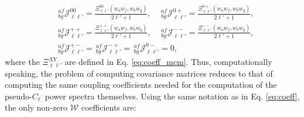 \documentclass[a4paper,11pt]{article}
\newcommand{\PCL}{pseudo-$C_\ell$~}
\begin{document}
      \begin{align}
        &\,^{af}_{bg}\mathcal{J}^{00}_{\ell\ell'}=\frac{\Xi^{00}_{\ell\ell'}(w_aw_f,w_bw_g)}{2\ell'+1},\hspace{12pt}
         \,^{af}_{bg}\mathcal{J}^{0+}_{\ell\ell'}=\frac{\Xi^{0+}_{\ell\ell'}(w_aw_f,w_bw_g)}{2\ell'+1},\\
        &\,^{af}_{bg}\mathcal{J}^{++}_{\ell\ell'}=\frac{\Xi^{++}_{\ell\ell'}(w_aw_f,w_bw_g)}{2\ell'+1},\hspace{12pt}
         \,^{af}_{bg}\mathcal{J}^{--}_{\ell\ell'}=\frac{\Xi^{--}_{\ell\ell'}(w_aw_f,w_bw_g)}{2\ell'+1},\\
        &\,^{af}_{bg}\mathcal{J}^{+-}_{\ell\ell'}=\,^{af}_{bg}\mathcal{J}^{-+}_{\ell\ell'}=\,^{af}_{bg}\mathcal{J}^{0-}_{\ell\ell'}=0,
      \end{align}
      where the $\Xi^{XY}_{\ell\ell'}$ are defined in Eq. \ref{eq:coeff_mcm}.
      Thus, computationally speaking, the problem of computing covariance matrices reduces to that of computing the same coupling coefficients needed for the computation of the \PCL power spectra themselves. Using the same notation as in Eq. \ref{eq:coeff}, the only non-zero $\mathcal{W}$ coefficients are:
\end{document}
